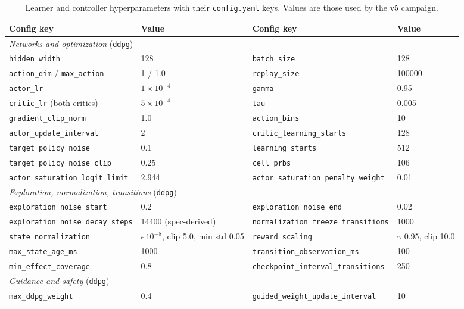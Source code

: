 \begin{table}[t]
\centering
\footnotesize
\caption{Learner and controller hyperparameters with their \texttt{config.yaml} keys. Values are those used by the v5 campaign.}
\label{tab:ctl-hyper}
\begin{tabular}{llll}
\toprule
Config key & Value & Config key & Value\\
\midrule
\multicolumn{4}{l}{\emph{Networks and optimization} (\texttt{ddpg})}\\
\texttt{hidden\_width} & 128 & \texttt{batch\_size} & 128\\
\texttt{action\_dim} / \texttt{max\_action} & 1 / 1.0 & \texttt{replay\_size} & 100000\\
\texttt{actor\_lr} & $1\times10^{-4}$ & \texttt{gamma} & 0.95\\
\texttt{critic\_lr} (both critics) & $5\times10^{-4}$ & \texttt{tau} & 0.005\\
\texttt{gradient\_clip\_norm} & 1.0 & \texttt{action\_bins} & 10\\
\texttt{actor\_update\_interval} & 2 & \texttt{critic\_learning\_starts} & 128\\
\texttt{target\_policy\_noise} & 0.1 & \texttt{learning\_starts} & 512\\
\texttt{target\_policy\_noise\_clip} & 0.25 & \texttt{cell\_prbs} & 106\\
\texttt{actor\_saturation\_logit\_limit} & 2.944 & \texttt{actor\_saturation\_penalty\_weight} & 0.01\\
\midrule
\multicolumn{4}{l}{\emph{Exploration, normalization, transitions} (\texttt{ddpg})}\\
\texttt{exploration\_noise\_start} & 0.2 & \texttt{exploration\_noise\_end} & 0.02\\
\texttt{exploration\_noise\_decay\_steps} & 14400 (spec-derived) & \texttt{normalization\_freeze\_transitions} & 1000\\
\texttt{state\_normalization} & $\epsilon\,10^{-8}$, clip 5.0, min std 0.05 & \texttt{reward\_scaling} & $\gamma$ 0.95, clip 10.0\\
\texttt{max\_state\_age\_ms} & 1000 & \texttt{transition\_observation\_ms} & 100\\
\texttt{min\_effect\_coverage} & 0.8 & \texttt{checkpoint\_interval\_transitions} & 250\\
\midrule
\multicolumn{4}{l}{\emph{Guidance and safety} (\texttt{ddpg})}\\
\texttt{max\_ddpg\_weight} & 0.4 & \texttt{guided\_weight\_update\_interval} & 10\\

\end{tabular}
\end{table}

